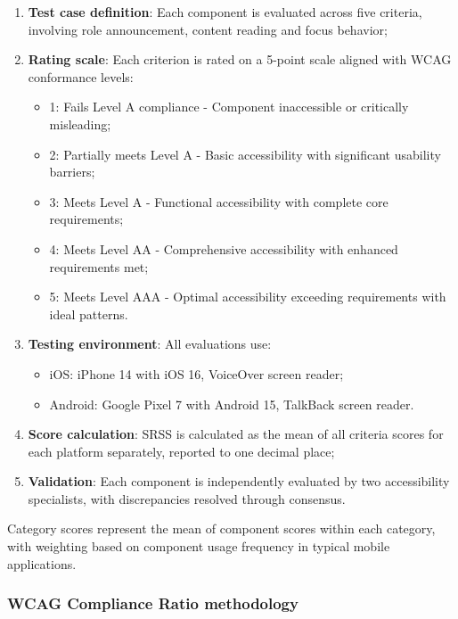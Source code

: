 \begin{enumerate}
    \item \textbf{Test case definition}: Each component is evaluated across five criteria, involving role announcement, content reading and focus behavior;
    
    \item \textbf{Rating scale}: Each criterion is rated on a 5-point scale aligned with WCAG conformance levels:
        \begin{itemize}
            \item 1: Fails Level A compliance - Component inaccessible or critically misleading;
            \item 2: Partially meets Level A - Basic accessibility with significant usability barriers;
            \item 3: Meets Level A - Functional accessibility with complete core requirements;
            \item 4: Meets Level AA - Comprehensive accessibility with enhanced requirements met;
            \item 5: Meets Level AAA - Optimal accessibility exceeding requirements with ideal patterns.
        \end{itemize}
    
    \item \textbf{Testing environment}: All evaluations use:
    \begin{itemize}
        \item iOS: iPhone 14 with iOS 16, VoiceOver screen reader;
        \item Android: Google Pixel 7 with Android 15, TalkBack screen reader.
    \end{itemize}
    
    \item \textbf{Score calculation}: SRSS is calculated as the mean of all criteria scores for each platform separately, reported to one decimal place;
    
    \item \textbf{Validation}: Each component is independently evaluated by two accessibility specialists, with discrepancies resolved through consensus.
\end{enumerate}

Category scores represent the mean of component scores within each category, with weighting based on component usage frequency in typical mobile applications.

\subsubsection{WCAG Compliance Ratio methodology}
\label{subsubsec:wcr-methodology}

